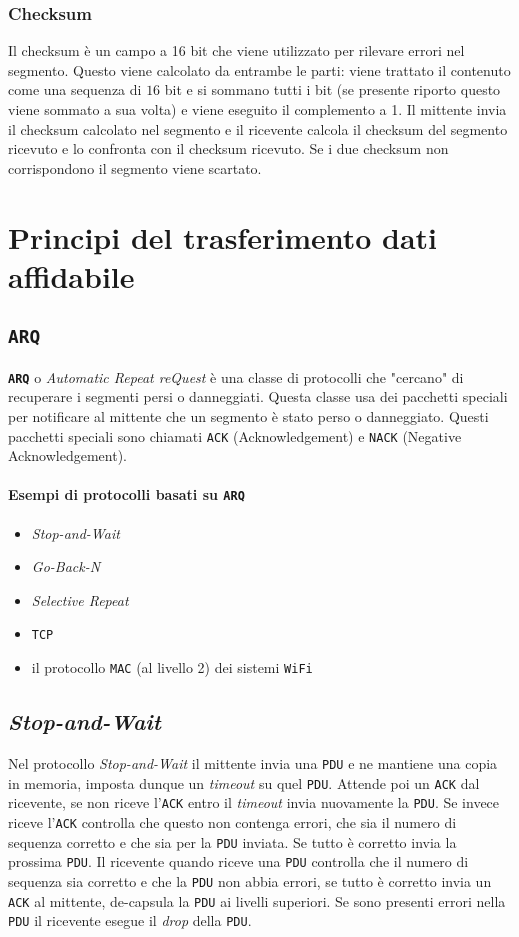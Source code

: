         \subsubsection{Checksum}
            Il checksum è un campo a 16 bit che viene utilizzato per rilevare errori nel segmento. Questo viene calcolato da entrambe le parti: viene trattato il contenuto come una sequenza di $ 16 $ bit e si sommano tutti i bit (se presente riporto questo viene sommato a sua volta) e viene eseguito il complemento a 1. Il mittente invia il checksum calcolato nel segmento e il ricevente calcola il checksum del segmento ricevuto e lo confronta con il checksum ricevuto. Se i due checksum non corrispondono il segmento viene scartato.
\section[trasferimento dati affidabile]{Principi del trasferimento dati affidabile}
    \subsection{\texttt{ARQ}}
        \textbf{\texttt{ARQ}} o \textit{Automatic Repeat reQuest} è una classe di protocolli che "cercano" di recuperare i segmenti persi o danneggiati. Questa classe usa dei pacchetti speciali per notificare al mittente che un segmento è stato perso o danneggiato. Questi pacchetti speciali sono chiamati \texttt{ACK} (Acknowledgement) e \texttt{NACK} (Negative Acknowledgement).
        \paragraph{Esempi di protocolli basati su \texttt{ARQ}} \begin{itemize}
            \item \textit{Stop-and-Wait}
            \item \textit{Go-Back-N}
            \item \textit{Selective Repeat}
            \item \texttt{TCP}
            \item il protocollo \texttt{MAC} (al livello 2) dei sistemi \texttt{WiFi}
        \end{itemize}
    \subsection{\textit{Stop-and-Wait}}
        Nel protocollo \textit{Stop-and-Wait} il mittente invia una \texttt{PDU} e ne mantiene una copia in memoria, imposta dunque un \textit{timeout} su quel \texttt{PDU}. Attende poi un \texttt{ACK} dal ricevente, se non riceve l'\texttt{ACK} entro il \textit{timeout} invia nuovamente la \texttt{PDU}. Se invece riceve l'\texttt{ACK} controlla che questo non contenga errori, che sia il numero di sequenza corretto e che sia per la \texttt{PDU} inviata. Se tutto è corretto invia la prossima \texttt{PDU}. Il ricevente quando riceve una \texttt{PDU} controlla che il numero di sequenza sia corretto e che la \texttt{PDU} non abbia errori, se tutto è corretto invia un \texttt{ACK} al mittente, de-capsula la \texttt{PDU} ai livelli superiori. Se sono presenti errori nella \texttt{PDU} il ricevente esegue il \textit{drop} della \texttt{PDU}.
